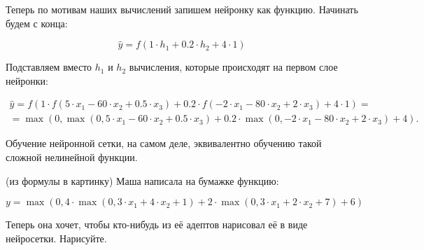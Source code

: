 \begin{sol}
Теперь по мотивам наших вычислений запишем нейронку как функцию. Начинать будем с конца:

$$
\hat y = f(1 \cdot h_1 + 0.2 \cdot h_2 + 4 \cdot 1)
$$

Подставляем вместо $h_1$ и $h_2$ вычисления, которые происходят на первом слое нейронки: 

\begin{multline*}
\hat y = f(1 \cdot f(5 \cdot x_1 -60 \cdot x_2 + 0.5 \cdot x_3) + 0.2 \cdot f(-2 \cdot x_1 -80 \cdot x_2 + 2 \cdot x_3) + 4 \cdot 1) = \\ = \max(0, \max(0, 5 \cdot x_1 -60 \cdot x_2 + 0.5 \cdot x_3) + 0.2 \cdot \max(0, -2 \cdot x_1 -80 \cdot x_2 + 2 \cdot x_3) + 4).
\end{multline*}

Обучение нейронной сетки, на самом деле, эквивалентно обучению такой сложной нелинейной функции. 
\end{sol}


\begin{problem}{(из формулы в картинку)}
Маша написала на бумажке функцию: 

\begin{equation*}
y = \max(0, 4 \cdot \max(0, 3 \cdot x_1 + 4 \cdot x_2 + 1) + 2 \cdot \max(0, 3 \cdot x_1 + 2 \cdot x_2 + 7) + 6)
\end{equation*} 

Теперь она хочет, чтобы кто-нибудь из её адептов нарисовал её в виде нейросетки. Нарисуйте.
\end{problem}

